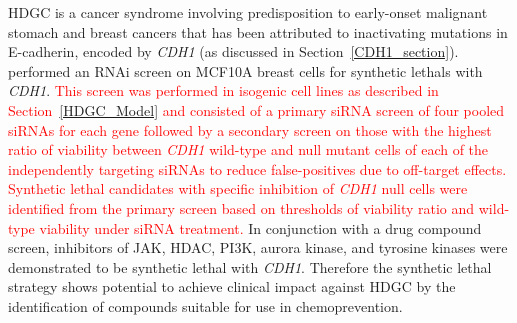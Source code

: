 \Gls{HDGC} is a cancer syndrome involving predisposition to early-onset malignant stomach and breast cancers that has been attributed to inactivating \glspl{mutation} in \gls{E-cadherin}, encoded by \textit{CDH1} (as discussed in Section~\ref{CDH1_section}). \citet{Telford2015} performed an \gls{RNAi} screen on MCF10A breast cells for \glspl{synthetic lethal} with \textit{CDH1}. \textcolor{red}{This screen was performed in isogenic cell lines as described in Section~\ref{HDGC_Model} and consisted of a primary siRNA screen of four pooled siRNAs for each gene followed by a secondary screen on those with the highest ratio of viability between \textit{CDH1} wild-type and null mutant cells of each of the independently targeting siRNAs to reduce false-positives due to off-target effects. Synthetic lethal candidates with specific inhibition of \textit{CDH1} null cells were identified from the primary screen based on thresholds of viability ratio and wild-type viability under siRNA treatment.} In conjunction with a drug compound screen, inhibitors of JAK, HDAC, PI3K, aurora kinase, and tyrosine kinases were demonstrated to be \gls{synthetic lethal} with \textit{CDH1}. Therefore the \gls{synthetic lethal} strategy shows potential to achieve clinical impact against \gls{HDGC} %
 by the identification of compounds suitable for use in \gls{chemoprevention}.


